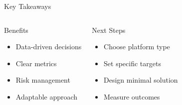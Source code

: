 \documentclass{beamer}
\begin{document}
\begin{frame}{Key Takeaways}
    \begin{columns}[T,onlytextwidth]
        \begin{block}{Benefits}
            \begin{itemize}
                \item Data-driven decisions
                \item Clear metrics
                \item Risk management
                \item Adaptable approach
            \end{itemize}
        \end{block}
        
        \begin{block}{Next Steps}
            \begin{itemize}
                \item Choose platform type
                \item Set specific targets
                \item Design minimal solution
                \item Measure outcomes
            \end{itemize}
        \end{block}
    \end{columns}
\end{frame}
\end{document}
